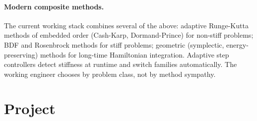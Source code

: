 \paragraph{Modern composite methods.} The current working stack
combines several of the above: adaptive Runge-Kutta methods of
embedded order (Cash-Karp, Dormand-Prince) for non-stiff
problems; BDF and Rosenbrock methods for stiff problems;
geometric (symplectic, energy-preserving) methods for long-time
Hamiltonian integration. Adaptive step controllers detect
stiffness at runtime and switch families automatically. The
working engineer chooses by problem class, not by method
sympathy.

\section{Project}

